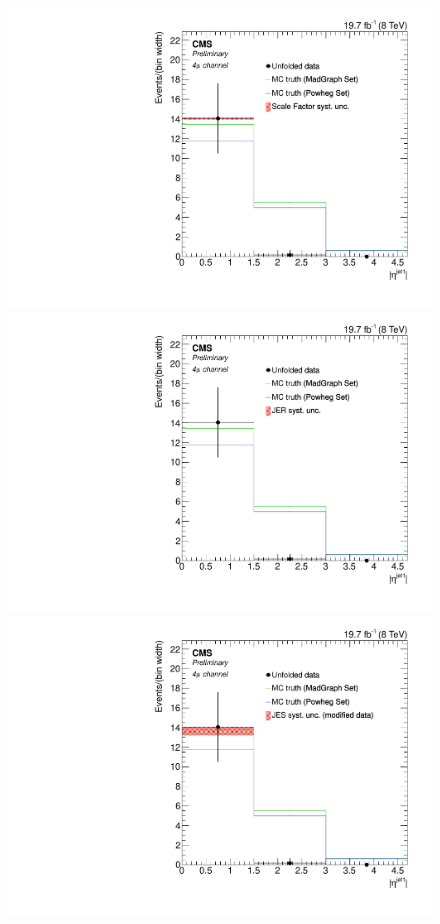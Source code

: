 \begin{figure}[hbtp]
\begin{center}
   \includegraphics[width=0.8\cmsFigWidth]{Figures/Unfolding/Systematics/ZZTo4m_EtaJet1_SFSq_Mad_fr}
   \includegraphics[width=0.8\cmsFigWidth]{Figures/Unfolding/Systematics/ZZTo4m_EtaJet1_JER_Mad_fr}
   \includegraphics[width=0.8\cmsFigWidth]{Figures/Unfolding/Systematics/ZZTo4m_EtaJet1_JES_ModData_Mad_fr}     

\end{center}
\end{figure}
